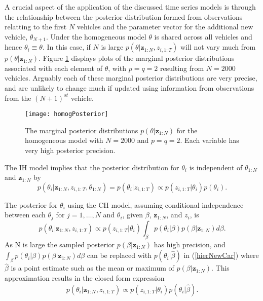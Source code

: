 \documentclass[12pt,a4paper]{article}\usepackage[]{graphicx}\usepackage[]{color}
\begin{document}
A crucial aspect of the application of the discussed time series models is through the relationship between the posterior distribution formed from observations relatting to the first $N$ vehicles and the parameter vector for the additional new vehicle, $\theta_{N+1}$. Under the homogeneous model $\theta$ is shared across all vehicles and hence $\theta_{i} \equiv \theta$. In this case, if $N$ is large $p(\theta | \textbf{z}_{1:N}, z_{i, 1:T})$ will not vary much from $p(\theta | \textbf{z}_{1:N})$. Figure \ref{fig:homogPosterior} displays plots of the marginal posterior distributions associated with each element of $\theta$, with $p = q = 2$ resulting from $N = 2000$ vehicles. Arguably each of these marginal posterior distributions are very precise, and are unlikely to change much if updated using information from observations from the $(N+1)^{st}$ vehicle.

\begin{figure}
\centering
\texttt{[image: homogPosterior]}
\caption{The marginal posterior distributions $p(\theta | \textbf{z}_{1:N})$ for the homogeneous model with $N = 2000$ and $p = q = 2$. Each variable has very high posterior precision.}
\label{fig:homogPosterior}
\end{figure}

The IH model implies that the posterior distribution for $\theta_i$ is independent of $\theta_{1:N}$ and $\textbf{z}_{1:N}$ by
\begin{equation}
p(\theta_{i}| \textbf{z}_{1:N}, z_{i,1:T}, \theta_{1:N}) = p(\theta_{i} | z_{i, 1:T}) \propto p(z_{i, 1:T} | \theta_i) p(\theta_i).
\label{indepNewCar}
\end{equation}

The posterior for $\theta_i$ using the CH model, assuming conditional independence between each $\theta_j$ for $j = 1, \dots, N$ and $\theta_i$, given $\beta$, $\textbf{z}_{1:N}$, and $z_i$, is
\begin{equation}
\label{hierNewCar}
p(\theta_{i} | \textbf{z}_{1:N}, z_{i, 1:T}) \propto p(z_{i, 1:T} | \theta_{i}) \int_{\beta} p(\theta_{i} | \beta) p (\beta | \textbf{z}_{1:N}) d\beta.
\end{equation}
As N is large the sampled posterior $p(\beta | \textbf{z}_{1:N})$ has high precision, and $\int_{\beta} p(\theta_{i} | \beta) p (\beta | \textbf{z}_{1:N}) d\beta$ can be replaced with $p(\theta_{i} | \hat{\beta})$ in (\ref{hierNewCar}) where $\hat{\beta}$ is a point estimate such as the mean or maximum of $p(\beta | \textbf{z}_{1:N})$. This approximation results in the closed form expression
\begin{equation}
\label{hierNewCar2}
p(\theta_{i} | \textbf{z}_{1:N}, z_{i, 1:T}) \propto p(z_{i, 1:T} | \theta_{i}) p(\theta_{i} | \hat{\beta}).
\end{equation}
\end{document}
